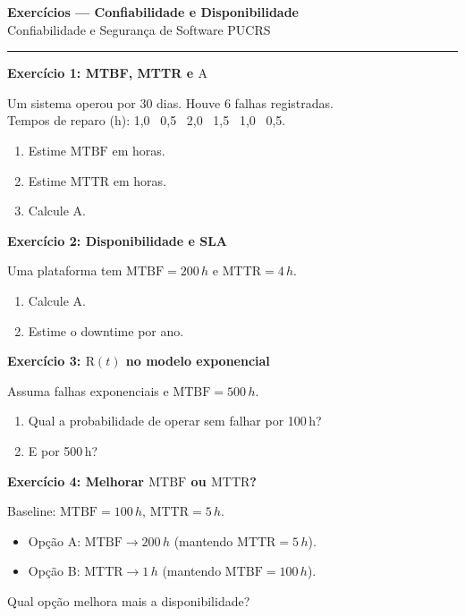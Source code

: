 \documentclass[10pt,a4paper]{article}
\newcommand{\R}{\mathrm{R}}
\newcommand{\A}{\mathrm{A}}
\newcommand{\MTBF}{\mathrm{MTBF}}
\newcommand{\MTTR}{\mathrm{MTTR}}
\begin{document}
\begin{center}
  {\large\bfseries Exercícios — Confiabilidade e Disponibilidade}\\[2pt]
  {\small Confiabilidade e Segurança de Software \textbar{} PUCRS}
\end{center}

\vspace{2pt}
\hrule
\vspace{4pt}

\textbf{Exercício 1: MTBF, MTTR e \(\A\)}

Um sistema operou por 30 dias. Houve 6 falhas registradas.\\
Tempos de reparo (h): 1,0 \ 0,5 \ 2,0 \ 1,5 \ 1,0 \ 0,5.
\begin{enumerate}
  \item Estime \(\MTBF\) em horas.
  \item Estime \(\MTTR\) em horas.
  \item Calcule \(\A\).
\end{enumerate}

\vspace{6pt}

\textbf{Exercício 2: Disponibilidade e SLA}

Uma plataforma tem \(\MTBF=200\,h\) e \(\MTTR=4\,h\).
\begin{enumerate}
  \item Calcule \(\A\).
  \item Estime o downtime por ano.
\end{enumerate}

\vspace{6pt}

\textbf{Exercício 3: \(\R(t)\) no modelo exponencial}

Assuma falhas exponenciais e \(\MTBF=500\,h\).
\begin{enumerate}
  \item Qual a probabilidade de operar sem falhar por 100\,h?
  \item E por 500\,h?
\end{enumerate}

\vspace{6pt}

\textbf{Exercício 4: Melhorar \(\MTBF\) ou \(\MTTR\)?}

Baseline: \(\MTBF=100\,h\), \(\MTTR=5\,h\).
\begin{itemize}
  \item Opção A: \(\MTBF \to 200\,h\) (mantendo \(\MTTR=5\,h\)).
  \item Opção B: \(\MTTR \to 1\,h\) (mantendo \(\MTBF=100\,h\)).
\end{itemize}
Qual opção melhora mais a disponibilidade?
\end{document}
